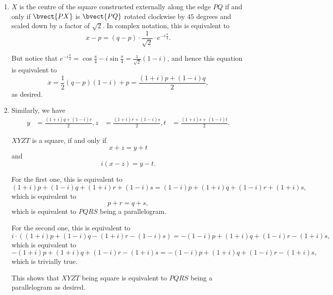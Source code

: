 \begin{enumerate}
    \item \(X\) is the centre of the square constructed externally along the edge \(PQ\) if and only if \(\bvect{PX}\) is \(\bvect{PQ}\) rotated clockwise by \(45\) degrees and scaled down by a factor of \(\sqrt{2}\). In complex notation, this is equivalent to
          \[
              x - p = (q - p) \cdot \frac{1}{\sqrt{2}} \cdot e^{-i\frac{\pi}{4}}.
          \]

          But notice that \(e^{-i\frac{\pi}{4}} = \cos \frac{\pi}{4} - i\sin\frac{\pi}{4} = \frac{1}{\sqrt{2}}(1 - i)\), and hence this equation is equivalent to
          \[
              x = \frac{1}{2} (q - p) (1 - i) + p = \frac{(1 + i)p + (1 - i)q}{2},
          \]
          as desired.
    \item Similarly, we have
          \begin{align*}
              y & = \frac{(1 + i)q + (1 - i)r}{2},
              z & = \frac{(1 + i)r + (1 - i)s}{2},
              t & = \frac{(1 + i)s + (1 - i)t}{2}.
          \end{align*}

          \(XYZT\) is a square, if and only if
          \[
              x + z = y + t
          \]
          and
          \[
              i(x - z) = y - t.
          \]

          For the first one, this is equivalent to
          \[
              (1 + i)p + (1 - i)q + (1 + i)r + (1 - i)s = (1 - i)p + (1 + i)q + (1 - i)r + (1 + i)s,
          \]
          which is equivalent to
          \[
              p + r = q + s,
          \]
          which is equivalent to \(PQRS\) being a parallelogram.

          For the second one, this is equivalent to
          \[
              i \cdot \left((1 + i)p + (1 - i)q - (1 + i)r - (1 - i)s\right) = -(1 - i)p + (1 + i)q + (1 - i)r - (1 + i)s,
          \]
          which is equivalent to
          \[
              -(1 + i)p + (1 + i)q + (1 - i) r -(1 + i)s = -(1 - i)p + (1 + i)q + (1 - i)r - (1 + i)s,
          \]
          which is trivially true.

          This shows that \(XYZT\) being square is equivalent to \(PQRS\) being a parallelogram as desired.

\end{enumerate}